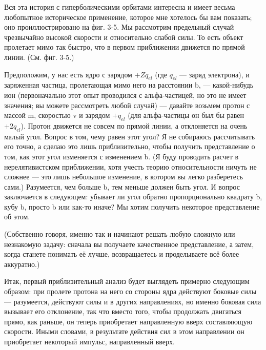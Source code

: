 \documentclass[10pt,oneside]{article}
\newcommand{\TipsSubsection}[1]{\par\vspace{6bp}{\normalsize\bfseries #1\par}\vspace{2bp}}
\begin{document}
\TipsSubsection{3-2 Открытие атомного ядра}

Вся эта история с гиперболическими орбитами интересна и имеет весьма любопытное историческое применение, которое мне хотелось бы вам показать; оно проиллюстрировано на фиг. 3-5. Мы рассмотрим предельный случай чрезвычайно высокой скорости и относительно слабой силы. То есть объект пролетает мимо так быстро, что в первом приближении движется по прямой линии. (См. фиг. 3-5.)\par

Предположим, у нас есть ядро с зарядом \(+Zq_{el}\) (где \(q_{el}\) --- заряд электрона), и заряженная частица, пролетающая мимо него на расстоянии b, --- какой-нибудь ион (первоначально этот опыт проводился с альфа-частицей, но это не имеет значения; вы можете рассмотреть любой случай) --- давайте возьмем протон с массой m, скоростью v и зарядом \(+q_{el}\) (для альфа-частицы он был бы равен \(+2q_{el}\)). Протон движется не совсем по прямой линии, а отклоняется на очень малый угол. Вопрос в том, чему равен этот угол? Я не собираюсь рассчитывать его точно, а сделаю это лишь приблизительно, чтобы получить представление о том, как этот угол изменяется с изменением b. (Я буду проводить расчет в нерелятивистском приближении, хотя учесть теорию относительности ничуть не сложнее --- это лишь небольшое изменение, в котором вы легко разберетесь сами.) Разумеется, чем больше b, тем меньше должен быть угол. И вопрос заключается в следующем: убывает ли угол обратно пропорционально квадрату b, кубу b, просто b или как-то иначе? Мы хотим получить некоторое представление об этом.\par

(Собственно говоря, именно так и начинают решать любую сложную или незнакомую задачу: сначала вы получаете качественное представление, а затем, когда станете понимать её лучше, возвращаетесь и проделываете всё более аккуратно.)\par

Итак, первый приблизительный анализ будет выглядеть примерно следующим образом: при пролете протона на него со стороны ядра действуют боковые силы --- разумеется, действуют силы и в других направлениях, но именно боковая сила вызывает его отклонение, так что вместо того, чтобы продолжать двигаться прямо, как раньше, он теперь приобретает направленную вверх составляющую скорости. Иными словами, в результате действия сил в этом направлении он приобретает некоторый импульс, направленный вверх.\par
\end{document}

